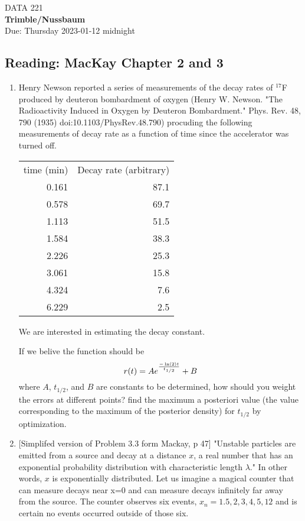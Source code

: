 \documentclass[12pt]{book}
\theoremstyle{definition}
\begin{document}
\begin{center}
{\Large DATA 221   }\\
\textbf{Trimble/Nussbaum}\\ %
Due: Thursday 2023-01-12  midnight
\end{center}

\vspace{0.2 cm}

\subsection*{Reading:  MacKay Chapter 2 and 3}

\begin{enumerate}
\item
Henry Newson reported a series of measurements of the decay rates of $^{17}$F produced by deuteron bombardment of oxygen
(Henry W. Newson.  "The Radioactivity Induced in Oxygen by Deuteron Bombardment." Phys. Rev. 48, 790 (1935) doi:10.1103/PhysRev.48.790)
procuding the following measurements of decay rate as a function of time since the accelerator was turned off.

\begin{tabular}{rr} \\
time (min) &    Decay rate (arbitrary) \\
0.161 & 87.1 \\
0.578 & 69.7 \\
1.113 & 51.5 \\
1.584 & 38.3 \\
2.226 & 25.3 \\
3.061 & 15.8 \\
4.324 & 7.6 \\
6.229 & 2.5 \\
\end{tabular}
We are interested in estimating the decay constant.  

If we belive the function should be 
$$ r(t) = A e ^{ - \ln (2) t \over t_{1/2} } + B $$
where $A$, $t_{1/2}$, and $B$ are constants to be determined,
how should you weight the errors at different points?
find the maximum a posteriori value (the value corresponding to the  maximum of the posterior density) for $t_{1/2} $ by optimization.

\item\label{breaths}
[Simplifed version of Problem 3.3 form Mackay, p 47] 
"Unstable particles are emitted from a source and decay at a distance $x$, a real number that has an exponential probability distribution with characteristic length $\lambda $."  In other words, $x$ is exponentially distributed.
Let us imagine a magical counter that can measure decays near x=0 and can measure decays infinitely far away from the source.  The counter observes six events, ${x_n} =  {1.5,2,3,4,5,12}$ and is certain no events occurred outside of those six. 


\end{enumerate}
\end{document}
